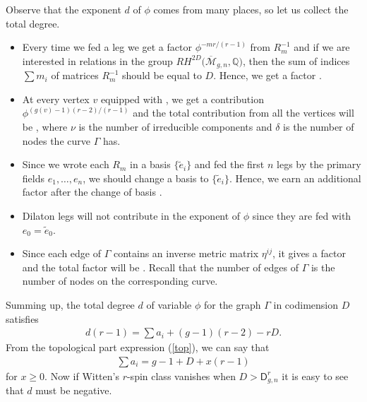 \documentclass[pdftex]{sigma}
\def\oM{\overline{\mathcal{M}}}
\def\D{\mathsf{D}}
\numberwithin{equation}{section}
\begin{document}
Observe that the exponent $d$ of $\phi$ comes from many places, so let us collect the total degree.%
\begin{itemize}\itemsep=0pt
 \item Every time we fed a leg we get a factor
$\phi^{-m r/(r-1)}$ from $R_m^{-1}$ and if we are
interested in relations in the group $RH^{2D}\big(\oM_{g,n},\mathbb{Q}\big)$, then the sum of indices $\sum m_i$ of matrices $R_m^{-1}$ should be equal to $D$. Hence, we get a factor .

\item At every vertex $v$ equipped with , we get a contribution $\phi ^{(g(v)-1)(r-2)/(r-1)}$ and the total contribution from all the vertices will be , where $\nu$ is the number of irreducible components and $\delta$ is the number of nodes the curve $\Gamma$ has.

\item Since we wrote each $R_m$ in a basis $\{\widetilde{e}_i\}$ and fed the first $n$ legs by the primary fields $e_1,\dots,e_n$, we should change a basis to $\{\widetilde{e}_i\}$. Hence, we earn an additional factor  after the change of basis .

 \item Dilaton legs will not contribute in the exponent of $\phi$ since they are fed with $e_0=\widetilde{e}_0$.

 \item Since each edge of $\Gamma$ contains an inverse metric matrix $\eta^{ij}$, it gives a factor  and the total factor will be . Recall that the number of edges of $\Gamma$ is the number of nodes on the corresponding curve.
 \end{itemize}

 Summing up, the total degree $d$ of variable $\phi$ for the graph $\Gamma$ in codimension $D$ satisfies
 \begin{align*}
 d(r-1) = \sum a_i + (g-1)(r-2) - r D.
 \end{align*}
 From the topological part expression (\ref{top}), we can say that
 \begin{align*}
 \sum a_i = g-1+D+x(r-1)
 \end{align*}
 for $x\geq 0$.
 Now if Witten's $r$-spin class vanishes when $D >\D^r_{g,n} $ it is easy to see that $d$ must be negative.
\end{document}
